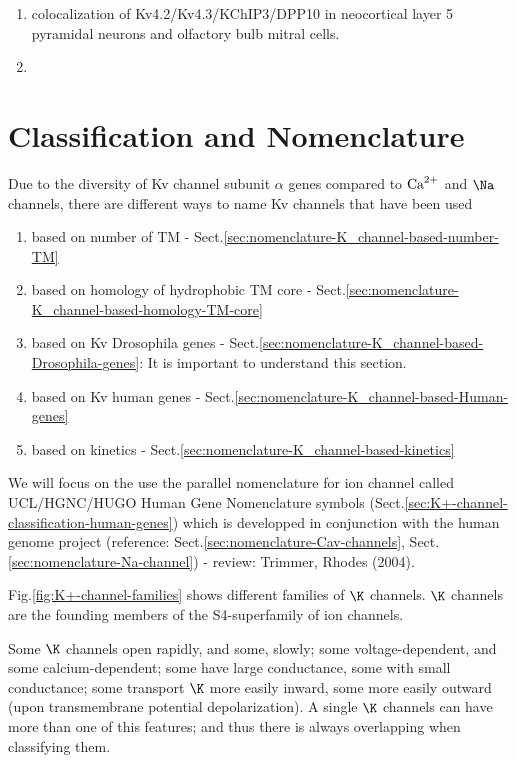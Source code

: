 \begin{enumerate}
  \item  colocalization of Kv4.2/Kv4.3/KChIP3/DPP10 in neocortical layer 5 pyramidal
neurons and olfactory bulb mitral cells.
  \item 
\end{enumerate}

\section{Classification and Nomenclature}
\label{sec:K_channel-nomenclature}
\label{sec:nomenclature-K_channel}

Due to the diversity of Kv channel subunit $\alpha$ genes compared to ${\text{Ca}^{2+}}$ and
$\Na$ channels, there are different ways to name Kv channels that have been used
\begin{enumerate}
  \item based on number of TM - Sect.\ref{sec:nomenclature-K_channel-based-number-TM}
  \item based on homology of hydrophobic TM core - Sect.\ref{sec:nomenclature-K_channel-based-homology-TM-core}
  \item based on Kv Drosophila genes -
  Sect.\ref{sec:nomenclature-K_channel-based-Drosophila-genes}: It is important
  to understand this section.

  \item based on Kv human genes - Sect.\ref{sec:nomenclature-K_channel-based-Human-genes}
  \item based on kinetics - Sect.\ref{sec:nomenclature-K_channel-based-kinetics}
\end{enumerate}
We will focus on the use the parallel nomenclature for ion channel called
UCL/HGNC/HUGO Human Gene Nomenclature symbols
(Sect.\ref{sec:K+-channel-classification-human-genes}) which is developped in
conjunction with the human genome project (reference:
Sect.\ref{sec:nomenclature-Cav-channels},
Sect.\ref{sec:nomenclature-Na-channel}) - review: Trimmer, Rhodes (2004).

Fig.\ref{fig:K+-channel-families} shows different families of $\K$ channels.
$\K$ channels are the founding members of the S4-superfamily of ion channels.

Some $\K$ channels open rapidly, and some, slowly; some voltage-dependent, and
some calcium-dependent; some have large conductance, some with small
conductance; some transport $\K$ more easily inward, some more easily outward
(upon transmembrane potential depolarization).
A single $\K$ channels can have more than one of this features; and thus there
is always overlapping when classifying them.

